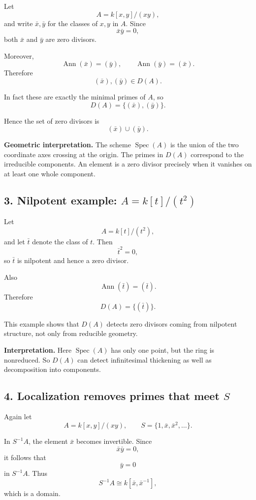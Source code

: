 \documentclass[12pt,a4paper,oneside]{report}
\DeclareMathOperator{\Spec}{Spec}
\DeclareMathOperator{\Ann}{Ann}
\theoremstyle{notespace}
\begin{document}
	Let
	\[
	A=k[x,y]/(xy),
	\]
	and write \(\bar x,\bar y\) for the classes of \(x,y\) in \(A\). Since
	\[
	\bar x\bar y=0,
	\]
	both \(\bar x\) and \(\bar y\) are zero divisors.
	
	Moreover,
	\[
	\Ann(\bar x)=(\bar y),
	\qquad
	\Ann(\bar y)=(\bar x).
	\]
	Therefore
	\[
	(\bar x),(\bar y)\in D(A).
	\]
	
	In fact these are exactly the minimal primes of \(A\), so
	\[
	D(A)=\{(\bar x),(\bar y)\}.
	\]
	
	Hence the set of zero divisors is
	\[
	(\bar x)\cup(\bar y).
	\]
	
	\medskip
	
	\noindent
	\textbf{Geometric interpretation.}
	The scheme \(\Spec(A)\) is the union of the two coordinate axes crossing at the origin.
	The primes in \(D(A)\) correspond to the irreducible components. An element is a zero divisor
	precisely when it vanishes on at least one whole component.
	
	\subsection{3. Nilpotent example: \(A=k[t]/(t^2)\)}
	
	Let
	\[
	A=k[t]/(t^2),
	\]
	and let \(\bar t\) denote the class of \(t\). Then
	\[
	\bar t^2=0,
	\]
	so \(\bar t\) is nilpotent and hence a zero divisor.
	
	Also
	\[
	\Ann(\bar t)=(\bar t).
	\]
	Therefore
	\[
	D(A)=\{(\bar t)\}.
	\]
	
	This example shows that \(D(A)\) detects zero divisors coming from nilpotent structure,
	not only from reducible geometry.
	
	\medskip
	
	\noindent
	\textbf{Interpretation.}
	Here \(\Spec(A)\) has only one point, but the ring is nonreduced.
	So \(D(A)\) can detect infinitesimal thickening as well as decomposition into components.
	
	\subsection{4. Localization removes primes that meet \(S\)}
	
	Again let
	\[
	A=k[x,y]/(xy),
	\qquad
	S=\{1,\bar x,\bar x^2,\dots\}.
	\]
	
	In \(S^{-1}A\), the element \(\bar x\) becomes invertible. Since
	\[
	\bar x\bar y=0,
	\]
	it follows that
	\[
	\bar y=0
	\]
	in \(S^{-1}A\). Thus
	\[
	S^{-1}A\cong k[\bar x,\bar x^{-1}],
	\]
	which is a domain.
	
\end{document}
